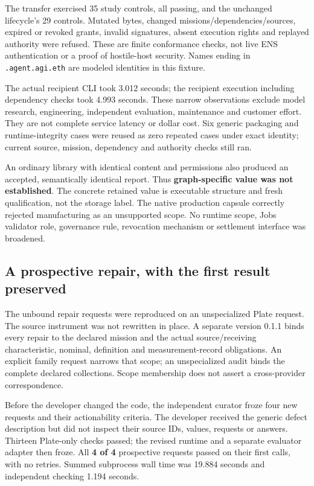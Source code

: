 \documentclass[
  11pt,
]{article}
\let\OriginalSubsection\subsection
\renewcommand{\subsection}{\needspace{6\baselineskip}\OriginalSubsection}
\begin{document}
The transfer exercised 35 study controls, all passing, and the unchanged
lifecycle's 29 controls. Mutated bytes, changed
missions/dependencies/sources, expired or revoked grants, invalid
signatures, absent execution rights and replayed authority were refused.
These are finite conformance checks, not live ENS authentication or a
proof of hostile-host security. Names ending in \texttt{.\allowbreak{}agent.\allowbreak{}agi.\allowbreak{}eth}
are modeled identities in this fixture.

The actual recipient CLI took 3.012 seconds; the recipient execution
including dependency checks took 4.993 seconds. These narrow
observations exclude model research, engineering, independent
evaluation, maintenance and customer effort. They are not complete
service latency or dollar cost. Six generic packaging and
runtime-integrity cases were reused as zero repeated cases under exact
identity; current source, mission, dependency and authority checks still
ran.

An ordinary library with identical content and permissions also produced
an accepted, semantically identical report. Thus \textbf{graph-specific
value was not established}. The concrete retained value is executable
structure and fresh qualification, not the storage label. The native
production capsule correctly rejected manufacturing as an unsupported
scope. No runtime scope, Jobs validator role, governance rule,
revocation mechanism or settlement interface was broadened.

\hypertarget{a-prospective-repair-with-the-first-result-preserved}{%
\subsection{A prospective repair, with the first result
preserved}\label{a-prospective-repair-with-the-first-result-preserved}}

The unbound repair requests were reproduced on an unspecialized Plate
request. The source instrument was not rewritten in place. A separate
version 0.1.1 binds every repair to the declared mission and the actual
source/receiving characteristic, nominal, definition and
measurement-record obligations. An explicit family request narrows that
scope; an unspecialized audit binds the complete declared collections.
Scope membership does not assert a cross-provider correspondence.

Before the developer changed the code, the independent curator froze
four new requests and their actionability criteria. The developer
received the generic defect description but did not inspect their source
IDs, values, requests or answers. Thirteen Plate-only checks passed; the
revised runtime and a separate evaluator adapter then froze. All
\textbf{4 of 4} prospective requests passed on their first calls, with
no retries. Summed subprocess wall time was 19.884 seconds and
independent checking 1.194 seconds.
\end{document}
